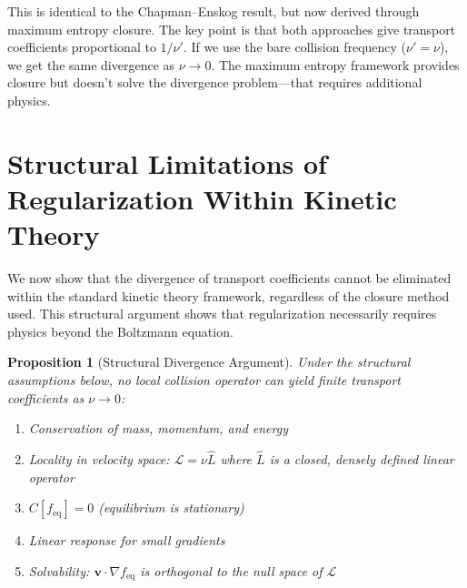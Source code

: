 \documentclass[12pt,a4paper]{article}
\newtheorem{proposition}[theorem]{Proposition}
\newcommand{\vect}[1]{\mathbf{#1}}
\begin{document}
This is identical to the Chapman--Enskog result, but now derived through maximum entropy closure. The key point is that both approaches give transport coefficients proportional to $1/\nu'$. If we use the bare collision frequency ($\nu' = \nu$), we get the same divergence as $\nu \to 0$. The maximum entropy framework provides closure but doesn't solve the divergence problem—that requires additional physics.

\section{Structural Limitations of Regularization Within Kinetic Theory}

We now show that the divergence of transport coefficients cannot be eliminated within the standard kinetic theory framework, regardless of the closure method used. This structural argument shows that regularization necessarily requires physics beyond the Boltzmann equation.

\begin{proposition}[Structural Divergence Argument]
\label{prop:divergence_argument}
Under the structural assumptions below, no local collision operator can yield finite transport coefficients as $\nu \to 0$:
\begin{enumerate}[label=(\roman*)]
\item Conservation of mass, momentum, and energy
\item Locality in velocity space: $\mathcal{L} = \nu \hat{L}$ where $\hat{L}$ is a closed, densely defined linear operator
\item $C[f_{\text{eq}}] = 0$ (equilibrium is stationary)
\item Linear response for small gradients
\item Solvability: $\vect{v} \cdot \nabla f_{\text{eq}}$ is orthogonal to the null space of $\mathcal{L}$
\end{enumerate}
\end{proposition}
\end{document}
